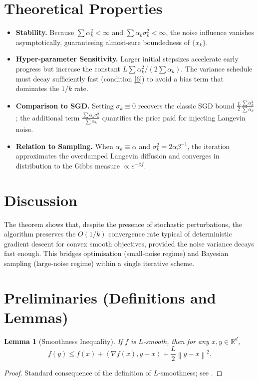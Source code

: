\documentclass{article}
\newtheorem{lemma}{Lemma}
\newcommand{\R}{\mathbb{R}}
\newcommand{\norm}[1]{\left\|#1\right\|}
\newcommand{\inner}[2]{\left\langle #1,#2\right\rangle}
\begin{document}
\section*{Theoretical Properties}
\begin{itemize}
\item \textbf{Stability.} Because $\sum\alpha_k^2<\infty$ and $\sum\alpha_k\sigma_k^2<\infty$, the noise influence vanishes asymptotically, guaranteeing almost‑sure boundedness of $\{x_k\}$.
\item \textbf{Hyper‑parameter Sensitivity.} Larger initial stepsizes accelerate early progress but increase the constant $L\sum\alpha_k^2/(2\sum\alpha_k)$. The variance schedule must decay sufficiently fast (condition \eqref{6}) to avoid a bias term that dominates the $1/k$ rate.
\item \textbf{Comparison to SGD.} Setting $\sigma_k\equiv0$ recovers the classic SGD bound $\frac{L}{2}\frac{\sum\alpha_k^2}{\sum\alpha_k}$; the additional term $\frac{\sum\alpha_k\sigma_k^2}{\sum\alpha_k}$ quantifies the price paid for injecting Langevin noise.
\item \textbf{Relation to Sampling.} When $\alpha_k\equiv\alpha$ and $\sigma_k^2=2\alpha\beta^{-1}$, the iteration approximates the overdamped Langevin diffusion and converges in distribution to the Gibbs measure $\propto e^{-\beta f}$.
\end{itemize}

\section*{Discussion}
The theorem shows that, despite the presence of stochastic perturbations, the algorithm preserves the $O(1/k)$ convergence rate typical of deterministic gradient descent for convex smooth objectives, provided the noise variance decays fast enough. This bridges optimisation (small‑noise regime) and Bayesian sampling (large‑noise regime) within a single iterative scheme.

\newpage
\section*{Preliminaries (Definitions and Lemmas)}
\begin{lemma}[Smoothness Inequality]\label{lem:smooth}
If $f$ is $L$‑smooth, then for any $x,y\in\R^d$,
\[
f(y)\le f(x)+\inner{\nabla f(x)}{y-x}+\frac{L}{2}\norm{y-x}^2 .
\tag{9}
\]
\end{lemma}
\begin{proof}
Standard consequence of the definition of $L$‑smoothness; see \cite{Nesterov2004}.
\end{proof}
\end{document}
